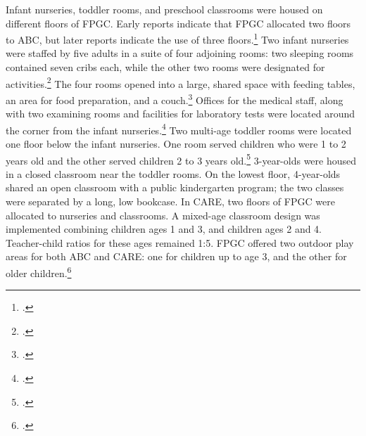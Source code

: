 \noindent Infant nurseries, toddler rooms, and preschool classrooms were housed on different floors of FPGC. Early reports indicate that FPGC allocated two floors to ABC, but later reports indicate the use of three floors.\footnote{\citet{Ramey_Smith_1977_AJMD,Ramey_Campbell_1979_SR,Ramey_1981_Modification}.} Two infant nurseries were staffed by five adults in a suite of four adjoining rooms: two sleeping rooms contained seven cribs each, while the other two rooms were designated for activities.\footnote{ \citet{Ramey-et-al_1977_Intro-to-ABC}.} The four rooms opened into a large, shared space with feeding tables, an area for food preparation, and a couch.\footnote{\citet{Ramey_Campbell_1979_SR}.} Offices for the medical staff, along with two examining rooms and facilities for laboratory tests were located around the corner from the infant nurseries.\footnote{\citet{abc2014-2015interviews}.} Two multi-age toddler rooms were located one floor below the infant nurseries. One room served children who were 1 to 2 years old and the other served children 2 to 3 years old.\footnote{\citet{Ramey_Smith_1977_AJMD,Ramey_Campbell_1979_SR}.} 3-year-olds were housed in a closed classroom near the toddler rooms. On the lowest floor, 4-year-olds shared an open classroom with a public kindergarten program; the two classes were separated by a long, low bookcase. In CARE, two floors of FPGC were allocated to nurseries and classrooms. A mixed-age classroom design was implemented combining children ages 1 and 3, and children ages 2 and 4. Teacher-child ratios for these ages remained 1:5. FPGC offered two outdoor play areas for both ABC and CARE: one for children up to age 3, and the other for older children.\footnote{\citet{Ramey_Campbell_1979_SR,Ramey_McGinness_etal_1982_Abecedarianapproach}.}\\

